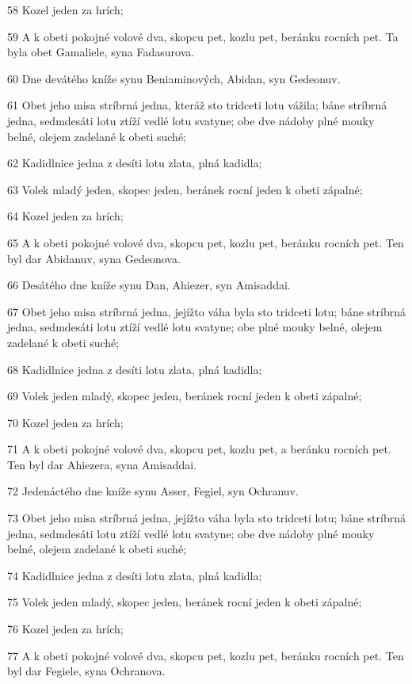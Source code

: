\par 58 Kozel jeden za hrích;
\par 59 A k obeti pokojné volové dva, skopcu pet, kozlu pet, beránku rocních pet. Ta byla obet Gamaliele, syna Fadasurova.
\par 60 Dne devátého kníže synu Beniaminových, Abidan, syn Gedeonuv.
\par 61 Obet jeho misa stríbrná jedna, kteráž sto tridceti lotu vážila; báne stríbrná jedna, sedmdesáti lotu ztíží vedlé lotu svatyne; obe dve nádoby plné mouky belné, olejem zadelané k obeti suché;
\par 62 Kadidlnice jedna z desíti lotu zlata, plná kadidla;
\par 63 Volek mladý jeden, skopec jeden, beránek rocní jeden k obeti zápalné;
\par 64 Kozel jeden za hrích;
\par 65 A k obeti pokojné volové dva, skopcu pet, kozlu pet, beránku rocních pet. Ten byl dar Abidanuv, syna Gedeonova.
\par 66 Desátého dne kníže synu Dan, Ahiezer, syn Amisaddai.
\par 67 Obet jeho misa stríbrná jedna, jejížto váha byla sto tridceti lotu; báne stríbrná jedna, sedmdesáti lotu ztíží vedlé lotu svatyne; obe plné mouky belné, olejem zadelané k obeti suché;
\par 68 Kadidlnice jedna z desíti lotu zlata, plná kadidla;
\par 69 Volek jeden mladý, skopec jeden, beránek rocní jeden k obeti zápalné;
\par 70 Kozel jeden za hrích;
\par 71 A k obeti pokojné volové dva, skopcu pet, kozlu pet, a beránku rocních pet. Ten byl dar Ahiezera, syna Amisaddai.
\par 72 Jedenáctého dne kníže synu Asser, Fegiel, syn Ochranuv.
\par 73 Obet jeho misa stríbrná jedna, jejížto váha byla sto tridceti lotu; báne stríbrná jedna, sedmdesáti lotu ztíží vedlé lotu svatyne; obe dve nádoby plné mouky belné, olejem zadelané k obeti suché;
\par 74 Kadidlnice jedna z desíti lotu zlata, plná kadidla;
\par 75 Volek jeden mladý, skopec jeden, beránek rocní jeden k obeti zápalné;
\par 76 Kozel jeden za hrích;
\par 77 A k obeti pokojné volové dva, skopcu pet, kozlu pet, beránku rocních pet. Ten byl dar Fegiele, syna Ochranova.
